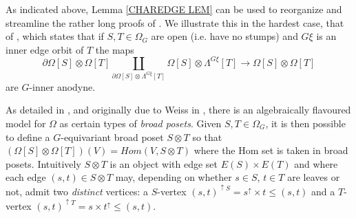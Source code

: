 \documentclass[a4paper,10pt,draft]{article}%
\begin{document}
\begin{example}
	As indicated above, Lemma \ref{CHAREDGE LEM} can be used to
	reorganize and streamline the rather long proofs of \cite[Thms 7.1 and 7.2]{Per17}. We illustrate this in the hardest case, that of \cite[Thm. 7.1(i)]{Per17}, which states that if
	$S,T \in \Omega_G$ are open (i.e. have no stumps) and
	$G \xi$ is an inner edge orbit of $T$ the maps
\begin{equation}\label{THM71 EQ}
	\partial \Omega[S] \otimes \Omega[T]
		\coprod_{\partial \Omega[S] \otimes \Lambda^{G\xi}[T]}
	\Omega[S] \otimes \Lambda^{G\xi}[T]
\to
	 \Omega[S] \otimes \Omega[T]
\end{equation}
are $G$-inner anodyne.

As detailed in \cite[\S 5.1]{Per17},
and originally due to Weiss in \cite{Wei12},
there is an algebraically flavoured model for $\Omega$
as certain types of \textit{broad posets}.
Given $S,T \in \Omega_G$, it is then possible \cite[\S 7.1]{Per17} to define a $G$-equivariant broad poset $S \otimes T$
so that 
$\left(\Omega[S] \otimes \Omega[T]\right)(V) = Hom(V,S \otimes T)$
where the Hom set is taken in broad posets.
Intuitively $S \otimes T$ is an object with edge set $E(S) \times E(T)$
and where each edge $(s,t) \in S \otimes T$
may, depending on whether $s \in S$, $t \in T$ are leaves or not,
admit two \textit{distinct} vertices: a $S$-vertex 
$(s,t)^{\uparrow S} = s^{\uparrow} \times t \leq (s,t)$
and a $T$-vertex
$(s,t)^{\uparrow T} = s \times t^{\uparrow} \leq (s,t)$.


\end{example}
\end{document}
